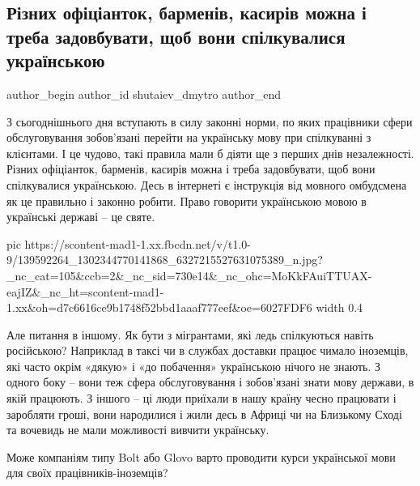  
 
 
 
 

\subsection{Різних офіціанток, барменів, касирів можна і треба задовбувати, щоб вони спілкувалися українською}
\label{sec:16_01_2021.fb.shutaiev_dmytro.1.mova}
\ifcmt
  author_begin
   author_id shutaiev_dmytro
  author_end
\fi

З сьогоднішнього дня вступають в силу законні норми, по яких працівники сфери
обслуговування зобов’язані перейти на українську мову при спілкуванні з
клієнтами. І це чудово, такі правила мали б діяти ще з перших днів
незалежності. Різних офіціанток, барменів, касирів можна і треба задовбувати,
щоб вони спілкувалися українською. Десь в інтернеті є інструкція від мовного
омбудсмена як це правильно і законно робити. Право говорити українською мовою в
українські державі – це святе.  

\ifcmt
  pic https://scontent-mad1-1.xx.fbcdn.net/v/t1.0-9/139592264_1302344770141868_6327215527631075389_n.jpg?_nc_cat=105&ccb=2&_nc_sid=730e14&_nc_ohc=MoKkFAuiTTUAX-eajIZ&_nc_ht=scontent-mad1-1.xx&oh=d7c6616ce9b1748f52bbd1aaaf777eef&oe=6027FDF6
  width 0.4
\fi

Але питання в іншому. Як бути з мігрантами, які ледь спілкуються навіть
російською? Наприклад в таксі чи в службах доставки працює чимало іноземців,
які часто окрім «дякую» і «до побачення» українською нічого не знають. З одного
боку – вони теж сфера обслуговування і зобов’язані знати мову держави, в якій
працюють. З іншого – ці люди приїхали в нашу країну чесно працювати і заробляти
гроші, вони народилися і жили десь в Африці чи на Близькому Сході та вочевидь
не мали можливості вивчити українську.  

Може компаніям типу Bolt або Glovo варто проводити курси української мови для
своїх працівників-іноземців?
